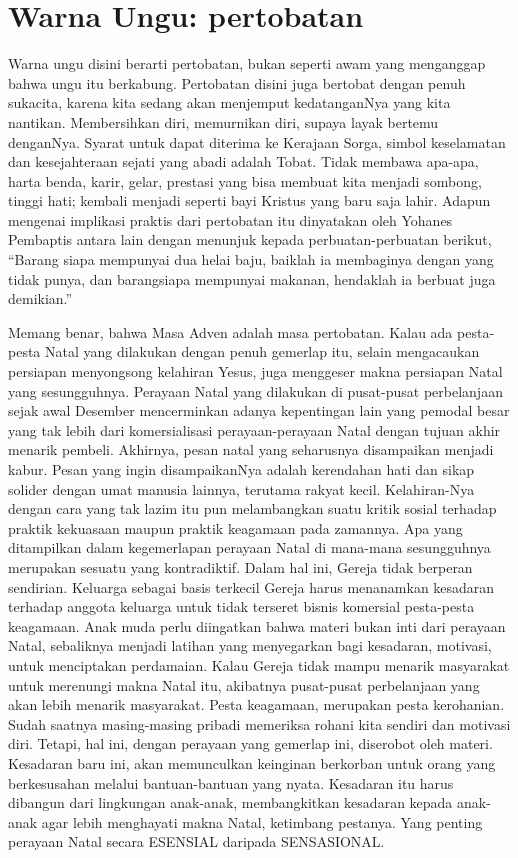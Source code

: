 \section*{Warna Ungu: pertobatan}
Warna ungu disini berarti pertobatan, bukan seperti awam yang menganggap bahwa ungu itu berkabung. Pertobatan disini juga bertobat dengan penuh sukacita, karena kita sedang akan menjemput kedatanganNya yang kita nantikan. Membersihkan diri, memurnikan diri, supaya layak bertemu denganNya. Syarat untuk dapat diterima ke Kerajaan Sorga, simbol keselamatan dan kesejahteraan sejati yang abadi adalah Tobat. Tidak membawa apa-apa, harta benda, karir, gelar, prestasi  yang bisa membuat kita menjadi sombong, tinggi hati; kembali menjadi seperti bayi Kristus yang baru saja lahir. Adapun mengenai implikasi praktis dari pertobatan itu dinyatakan oleh Yohanes Pembaptis antara lain dengan menunjuk kepada perbuatan-perbuatan berikut, ``Barang siapa mempunyai dua helai baju, baiklah ia membaginya dengan yang tidak punya, dan barangsiapa mempunyai makanan, hendaklah ia berbuat juga demikian.'' 

Memang benar, bahwa Masa Adven adalah masa pertobatan. Kalau ada pesta-pesta Natal yang dilakukan dengan penuh gemerlap itu, selain mengacaukan persiapan menyongsong kelahiran Yesus, juga menggeser makna persiapan Natal yang sesungguhnya. Perayaan Natal yang dilakukan di pusat-pusat perbelanjaan sejak awal Desember mencerminkan adanya kepentingan lain yang pemodal besar yang tak lebih dari komersialisasi perayaan-perayaan Natal dengan tujuan akhir menarik pembeli. Akhirnya, pesan natal yang seharusnya disampaikan menjadi kabur. Pesan yang ingin disampaikanNya adalah kerendahan hati dan sikap solider dengan umat manusia lainnya, terutama rakyat kecil. Kelahiran-Nya dengan cara yang tak lazim itu pun melambangkan suatu kritik sosial terhadap praktik kekuasaan maupun praktik keagamaan pada zamannya. Apa yang ditampilkan dalam kegemerlapan perayaan Natal di mana-mana sesungguhnya merupakan sesuatu yang kontradiktif. Dalam hal ini, Gereja tidak berperan sendirian. Keluarga sebagai basis terkecil Gereja harus menanamkan kesadaran terhadap anggota keluarga untuk tidak terseret bisnis komersial pesta-pesta keagamaan. Anak muda perlu diingatkan bahwa materi bukan inti dari perayaan Natal, sebaliknya menjadi latihan yang menyegarkan bagi kesadaran, motivasi, untuk menciptakan perdamaian. Kalau Gereja tidak mampu menarik masyarakat untuk merenungi makna Natal itu, akibatnya pusat-pusat perbelanjaan yang akan lebih menarik masyarakat. Pesta keagamaan, merupakan pesta kerohanian. Sudah saatnya masing-masing pribadi memeriksa rohani kita sendiri dan motivasi diri. Tetapi, hal ini, dengan perayaan yang gemerlap ini, diserobot oleh materi. Kesadaran baru ini, akan memunculkan keinginan berkorban untuk orang yang berkesusahan melalui bantuan-bantuan yang nyata. Kesadaran itu harus dibangun dari lingkungan anak-anak, membangkitkan kesadaran kepada anak-anak agar lebih menghayati makna Natal, ketimbang pestanya. Yang penting perayaan Natal secara ESENSIAL daripada SENSASIONAL. 


